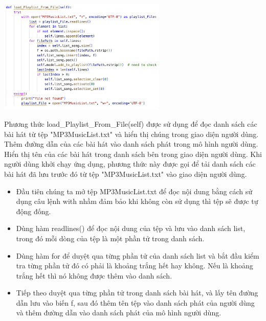 \documentclass[a4paper]{article}
\begin{document}
\begin{center}
\includegraphics[width=80mm]{template_SGU 2/audio_loadPlay.png}
\end{center}
\hspace*{0.5} Phương thức load\_Playlist\_From\_File(self) được sử dụng để đọc danh sách các bài hát từ tệp "MP3MusicList.txt" và hiển thị chúng trong giao diện người dùng. Thêm đường dẫn của các bài hát vào danh sách phát trong mô hình người dùng. Hiển thị tên của các bài hát trong danh sách bên trong giao diện người dùng. Khi người dùng khởi chạy ứng dụng, phương thức này được gọi để tải danh sách các bài hát đã lưu trước đó từ tệp "MP3MusicList.txt" vào giao diện người dùng.
\begin{itemize}
    \item Đầu tiên chúng ta mở tệp MP3MusicList.txt để đọc nội dung bằng cách sử dụng câu lệnh with nhầm đảm bảo khi không còn sử dụng thì tệp sẽ được tự động đống.
    \item Dùng hàm readlines() để đọc nội dung của tệp và lưu vào danh sách list, trong đó mỗi dòng của tệp là một phần tử trong danh sách.
    \item Dùng hàm for để duyệt qua từng phần tử của danh sách list và bắt đầu kiểm tra từng phần tử đó có phải là khoảng trắng hết hay không. Nếu là khoảng trắng hết thì nó không được thêm vào danh sách.
    \item Tiếp theo duyệt qua từng phần tử trong danh sách bài hát, và lấy tên đường dẫn lưu vào biến f, sau đó thêm tên tệp vào danh sách phát của người dùng và thêm đường dẫn vào danh sách phát của mô hình người dùng.
\end{itemize}
\end{document}
